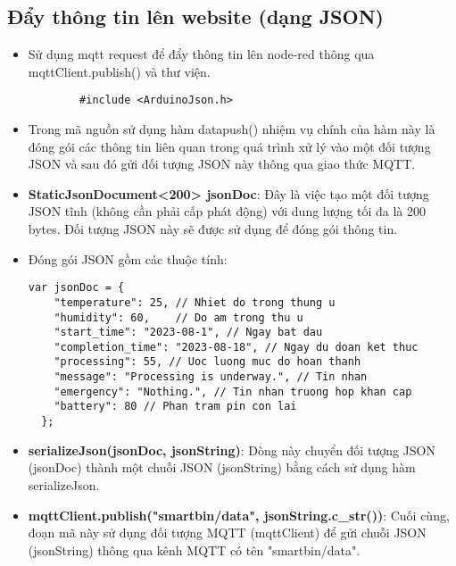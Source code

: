 \documentclass[12pt, a4paper]{article}
\begin{document}
\subsection{Đẩy thông tin lên website (dạng JSON)}
\begin{itemize}
    \item Sử dụng mqtt request để đẩy thông tin lên node-red thông qua mqttClient.publish() và thư viện.
    \begin{lstlisting}
        #include <ArduinoJson.h>\end{lstlisting}
    \item Trong mã nguồn sử dụng hàm datapush() nhiệm vụ chính của hàm này là đóng gói các thông tin liên quan trong quá trình xử lý vào một đối tượng JSON và sau đó gửi đối tượng JSON này thông qua giao thức MQTT.
    \item \textbf{StaticJsonDocument<200> jsonDoc}: Đây là việc tạo một đối tượng JSON tĩnh (không cần phải cấp phát động) với dung lượng tối đa là 200 bytes. Đối tượng JSON này sẽ được sử dụng để đóng gói thông tin.
    \item Đóng gói JSON gồm các thuộc tính:
        \begin{lstlisting}
var jsonDoc = {
    "temperature": 25, // Nhiet do trong thung u
    "humidity": 60,    // Do am trong thu u
    "start_time": "2023-08-1", // Ngay bat dau
    "completion_time": "2023-08-18", // Ngay du doan ket thuc
    "processing": 55, // Uoc luong muc do hoan thanh
    "message": "Processing is underway.", // Tin nhan
    "emergency": "Nothing.", // Tin nhan truong hop khan cap
    "battery": 80 // Phan tram pin con lai
  };\end{lstlisting}
    \item \textbf{serializeJson(jsonDoc, jsonString)}: Dòng này chuyển đối tượng JSON (jsonDoc) thành một chuỗi JSON (jsonString) bằng cách sử dụng hàm serializeJson.
    \item \textbf{mqttClient.publish("smartbin/data", jsonString.c\_str())}: Cuối cùng, đoạn mã này sử dụng đối tượng MQTT (mqttClient) để gửi chuỗi JSON (jsonString) thông qua kênh MQTT có tên "smartbin/data".
\end{itemize}
\end{document}
